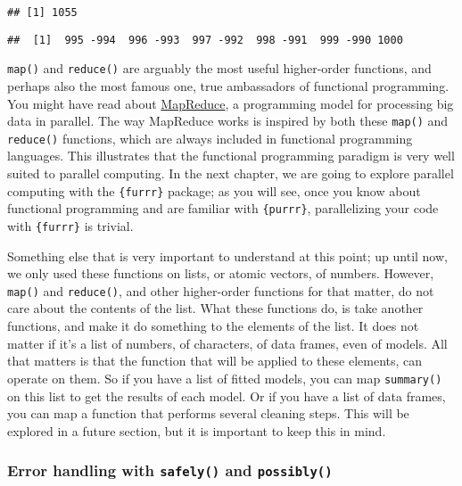 \documentclass[
]{article}
\begin{document}
\begin{verbatim}
## [1] 1055
\end{verbatim}

\begin{verbatim}
##  [1]  995 -994  996 -993  997 -992  998 -991  999 -990 1000
\end{verbatim}

\texttt{map()} and \texttt{reduce()} are arguably the most useful higher-order functions, and perhaps also the
most famous one, true ambassadors of functional programming. You might have read about
\href{https://en.wikipedia.org/wiki/MapReduce}{MapReduce}, a programming model for processing big
data in parallel. The way MapReduce works is inspired by both these \texttt{map()} and \texttt{reduce()} functions,
which are always included in functional programming languages. This illustrates that the functional
programming paradigm is very well suited to parallel computing. In the next chapter, we are going
to explore parallel computing with the \texttt{\{furrr\}} package; as you will see, once you know about
functional programming and are familiar with \texttt{\{purrr\}}, parallelizing your code with \texttt{\{furrr\}} is
trivial.

Something else that is very important to understand at this point; up until now, we only used these
functions on lists, or atomic vectors, of numbers. However, \texttt{map()} and \texttt{reduce()}, and other
higher-order functions for that matter, do not care about the contents of the list. What these
functions do, is take another functions, and make it do something to the elements of the list.
It does not matter if it's a list of numbers, of characters, of data frames, even of models. All that
matters is that the function that will be applied to these elements, can operate on them.
So if you have a list of fitted models, you can map \texttt{summary()} on this list to get the results of
each model. Or if you have a list of data frames, you can map a function that performs several
cleaning steps. This will be explored in a future section, but it is important to keep this in mind.

\hypertarget{error-handling-with-safely-and-possibly}{%
\subsubsection{\texorpdfstring{Error handling with \texttt{safely()} and \texttt{possibly()}}{Error handling with safely() and possibly()}}\label{error-handling-with-safely-and-possibly}}
\end{document}
